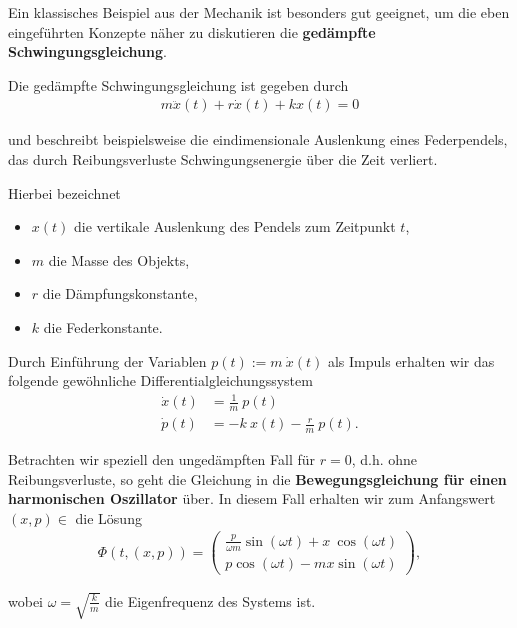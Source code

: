\documentclass[letterpaper,10pt,english]{jupyterBook}
\begin{document}
\par
Ein klassisches Beispiel aus der Mechanik ist besonders gut geeignet, um die eben eingeführten Konzepte näher zu diskutieren   die \textbf{gedämpfte Schwingungsgleichung}.
\label{ode/fluesse:ex:oscillations}
\begin{example}{}{}



\par
Die gedämpfte Schwingungsgleichung ist gegeben durch
\begin{align*}
m\ddot{x}(t) + r\dot{x}(t) + kx(t)=0
\end{align*}
\par
und beschreibt beispielsweise die eindimensionale Auslenkung eines Federpendels, das durch Reibungsverluste Schwingungsenergie über die Zeit verliert.

\par
Hierbei bezeichnet
\begin{itemize}
\item {} 
\par
\(x(t)\) die vertikale Auslenkung des Pendels zum Zeitpunkt \(t\),

\item {} 
\par
\(m\) die Masse des Objekts,

\item {} 
\par
\(r\) die Dämpfungskonstante,

\item {} 
\par
\(k\) die Federkonstante.

\end{itemize}

\par
Durch Einführung der Variablen \(p(t):= m~\dot{x}(t)\) als Impuls erhalten wir das folgende gewöhnliche Differentialgleichungssystem
\begin{align*}
\dot{x}(t) &= \frac{1}{m}~p(t) \\
\dot{p}(t) &= -k~x(t) - \frac{r}{m}~p(t).
\end{align*}
\par
Betrachten wir speziell den ungedämpften Fall für \(r=0\), d.h. ohne Reibungsverluste, so geht die Gleichung in die \textbf{Bewegungsgleichung für einen harmonischen Oszillator} über.
In diesem Fall erhalten wir zum Anfangswert \((x,p) \in \) die Lösung
\begin{align*}
\Phi(t, (x,p)) = 
\begin{pmatrix}
\frac{p}{\omega m}\sin(\omega t) + x~\cos(\omega t)\\
p \cos(\omega t) - m x \sin(\omega t)
\end{pmatrix},
\end{align*}
\par
wobei \(\omega=\sqrt{\frac{k}{m}}\) die Eigenfrequenz des Systems ist.
\end{example}
\end{document}
